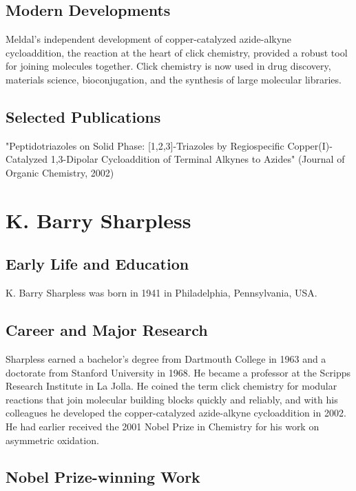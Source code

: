 \subsection*{Modern Developments}

Meldal's independent development of copper-catalyzed azide-alkyne cycloaddition, the reaction at the heart of click chemistry, provided a robust tool for joining molecules together. Click chemistry is now used in drug discovery, materials science, bioconjugation, and the synthesis of large molecular libraries.

\subsection*{Selected Publications}

"Peptidotriazoles on Solid Phase: [1,2,3]-Triazoles by Regiospecific Copper(I)-Catalyzed 1,3-Dipolar Cycloaddition of Terminal Alkynes to Azides" (Journal of Organic Chemistry, 2002)

\clearpage

\section{K. Barry Sharpless}

\subsection*{Early Life and Education}

K. Barry Sharpless was born in 1941 in Philadelphia, Pennsylvania, USA.

\subsection*{Career and Major Research}

Sharpless earned a bachelor's degree from Dartmouth College in 1963 and a doctorate from Stanford University in 1968. He became a professor at the Scripps Research Institute in La Jolla. He coined the term click chemistry for modular reactions that join molecular building blocks quickly and reliably, and with his colleagues he developed the copper-catalyzed azide-alkyne cycloaddition in 2002. He had earlier received the 2001 Nobel Prize in Chemistry for his work on asymmetric oxidation.

\subsection*{Nobel Prize-winning Work}

